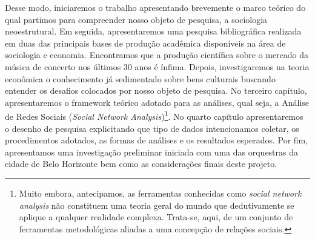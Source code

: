 \documentclass[a4paper, 12pt, openright, oneside, german, french, english, brazil]{abntex2}
\begin{document}
	Desse modo, iniciaremos o trabalho apresentando brevemente o marco teórico do qual partimos para compreender nosso objeto de pesquisa, a sociologia neoestrutural. Em seguida, apresentaremos uma pesquisa bibliográfica realizada em duas das principais bases de produção acadêmica disponíveis na área de sociologia e economia. Encontramos que a produção científica sobre o mercado da música de concerto nos últimos 30 anos é ínfima. Depois, investigaremos na teoria econômica o conhecimento já sedimentado sobre bens culturais buscando entender os desafios colocados por nosso objeto de pesquisa. No terceiro capítulo, apresentaremos o framework teórico adotado para as análises, qual seja, a Análise de Redes Sociais (\textit{Social Network Analysis})\footnote{Muito embora, antecipamos, as ferramentas conhecidas como \textit{social network analysis} não constituem uma teoria geral do mundo que dedutivamente se aplique a qualquer realidade complexa. Trata-se, aqui, de um conjunto de ferramentas metodológicas aliadas a uma concepção de relações sociais.}. No quarto capítulo apresentaremos o desenho de pesquisa explicitando que tipo de dados intencionamos coletar, os procedimentos adotados, as formas de análises e os resultados esperados. Por fim, apresentamos uma investigação preliminar iniciada com uma das orquestras da cidade de Belo Horizonte bem como as considerações finais deste projeto.






\end{document}

